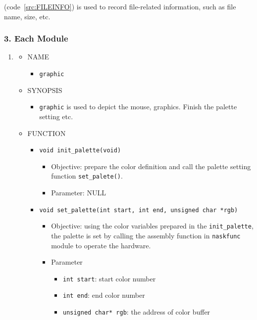\documentclass{swfcthesis}
\begin{document}
(code~\ref{src:FILEINFO}) is used to record file-related information, such as file name, size,
etc.



    
\subsubsection{3. Each Module}
\label{sec:3.-modules-kernel}

\begin{enumerate}
\item
  \begin{itemize}
  \item NAME
    \begin{itemize}
    \item \texttt{graphic}
    \end{itemize}
    
  \item SYNOPSIS
    \begin{itemize}
    \item \texttt{graphic} is used to depict the mouse, graphics. Finish the palette setting etc.
    \end{itemize}
    
  \item FUNCTION
    \begin{itemize}
    \item \texttt{void init\_palette(void)}
      \begin{itemize}
      \item Objective: prepare the color definition and call the palette setting function
        \texttt{set\_palete()}.
      \item Parameter: NULL
      \end{itemize}
      
    \item \texttt{void set\_palette(int start, int end, unsigned char *rgb)}
      \begin{itemize}
      \item Objective: using the color variables prepared in the \texttt{init\_palette},
        the palette is set by calling the assembly function in \texttt{naskfunc} module to
        operate the hardware.
      \item Parameter
        \begin{itemize}
        \item \texttt{int start}: start color number
        \item \texttt{int end}: end color number
        \item \texttt{unsigned char* rgb}: the address of color buffer
        \end{itemize}
      \end{itemize}


\end{itemize}
\end{itemize}
\end{enumerate}
\end{document}
